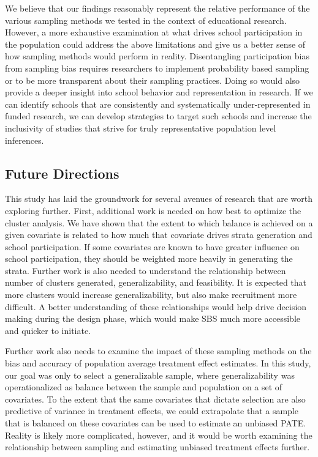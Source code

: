 \documentclass[
  english,
  man,floatsintext]{apa6}
\begin{document}
We believe that our findings reasonably represent the relative performance of the various sampling methods we tested in the context of educational research. However, a more exhaustive examination at what drives school participation in the population could address the above limitations and give us a better sense of how sampling methods would perform in reality. Disentangling participation bias from sampling bias requires researchers to implement probability based sampling or to be more transparent about their sampling practices. Doing so would also provide a deeper insight into school behavior and representation in research. If we can identify schools that are consistently and systematically under-represented in funded research, we can develop strategies to target such schools and increase the inclusivity of studies that strive for truly representative population level inferences.

\hypertarget{future-directions}{%
\subsection{Future Directions}\label{future-directions}}

This study has laid the groundwork for several avenues of research that are worth exploring further. First, additional work is needed on how best to optimize the cluster analysis. We have shown that the extent to which balance is achieved on a given covariate is related to how much that covariate drives strata generation and school participation. If some covariates are known to have greater influence on school participation, they should be weighted more heavily in generating the strata. Further work is also needed to understand the relationship between number of clusters generated, generalizability, and feasibility. It is expected that more clusters would increase generalizability, but also make recruitment more difficult. A better understanding of these relationships would help drive decision making during the design phase, which would make SBS much more accessible and quicker to initiate.

Further work also needs to examine the impact of these sampling methods on the bias and accuracy of population average treatment effect estimates. In this study, our goal was only to select a generalizable sample, where generalizability was operationalized as balance between the sample and population on a set of covariates. To the extent that the same covariates that dictate selection are also predictive of variance in treatment effects, we could extrapolate that a sample that is balanced on these covariates can be used to estimate an unbiased PATE. Reality is likely more complicated, however, and it would be worth examining the relationship between sampling and estimating unbiased treatment effects further.
\end{document}
